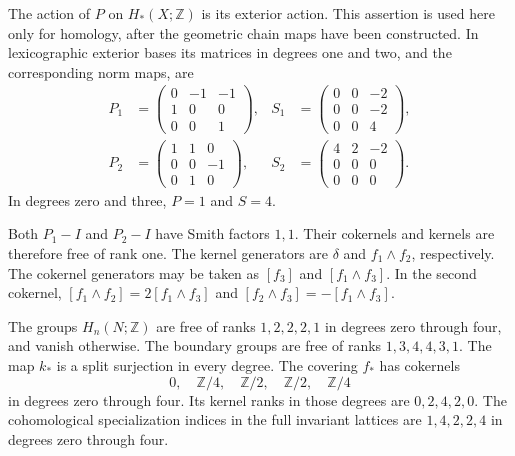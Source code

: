 The action of $P$ on $H_*(X;\mathbb Z)$ is its exterior action.
This assertion is used here only for homology, after the geometric chain
maps have been constructed. In lexicographic exterior bases its matrices
in degrees one and two, and the corresponding norm maps, are
\begin{equation}\label{of:eq:exterior}
 \begin{aligned}
 P_1&=\begin{pmatrix}0&-1&-1\\1&0&0\\0&0&1\end{pmatrix},&
 S_1&=\begin{pmatrix}0&0&-2\\0&0&-2\\0&0&4\end{pmatrix},\\
 P_2&=\begin{pmatrix}1&1&0\\0&0&-1\\0&1&0\end{pmatrix},&
 S_2&=\begin{pmatrix}4&2&-2\\0&0&0\\0&0&0\end{pmatrix}.
 \end{aligned}
\end{equation}
In degrees zero and three, $P=1$ and $S=4$.

Both $P_1-I$ and $P_2-I$ have Smith factors $1,1$.
Their cokernels and kernels are therefore free of rank one.
The kernel generators are $\delta$ and $f_1\wedge f_2$, respectively.
The cokernel generators may be taken as $[f_3]$ and
$[f_1\wedge f_3]$.
In the second cokernel,
$[f_1\wedge f_2]=2[f_1\wedge f_3]$ and
$[f_2\wedge f_3]=-[f_1\wedge f_3]$.

\begin{proposition}\label{of:prop:homology}
The groups $H_n(N;\mathbb Z)$ are free of ranks $1,2,2,2,1$ in degrees
zero through four, and vanish otherwise.
The boundary groups are free of ranks $1,3,4,4,3,1$.
The map $k_*$ is a split surjection in every degree.
The covering $f_*$ has cokernels
\begin{equation}\label{of:eq:indices}
 0,\quad\mathbb Z/4,\quad\mathbb Z/2,\quad\mathbb Z/2,
 \quad\mathbb Z/4
\end{equation}
in degrees zero through four.
Its kernel ranks in those degrees are $0,2,4,2,0$.
The cohomological specialization indices in the full invariant lattices
are $1,4,2,2,4$ in degrees zero through four.
\end{proposition}

